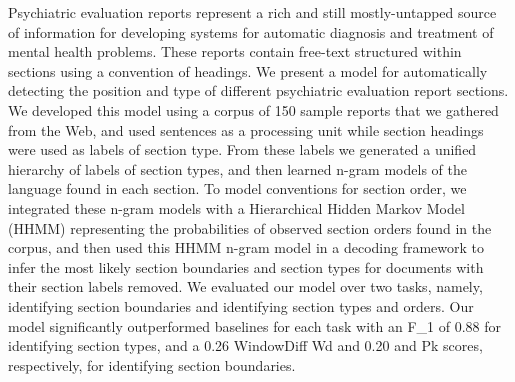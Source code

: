 Psychiatric evaluation reports represent a rich and still mostly-untapped source of information for developing systems for automatic diagnosis and treatment of mental health problems. These reports contain free-text structured within sections using a convention of headings. We present a model for automatically detecting the position and type of different psychiatric evaluation report sections. We developed this model using a corpus of 150 sample reports that we gathered from the Web, and used sentences as a processing unit while section headings were used as labels of section type. From these labels we generated a unified hierarchy of labels of section types, and then learned n-gram models of the language found in each section. To model conventions for section order, we integrated these n-gram models with a Hierarchical Hidden Markov Model (HHMM) representing the probabilities of observed section orders found in the corpus, and then used this HHMM n-gram model in a decoding framework to infer the most likely section boundaries and section types for documents with their section labels removed. We evaluated our model over two tasks, namely, identifying section boundaries and identifying section types and orders. Our model significantly outperformed baselines for each task with an F\_1 of 0.88 for identifying section types, and a 0.26 WindowDiff Wd and 0.20 and Pk scores, respectively, for identifying section boundaries.
